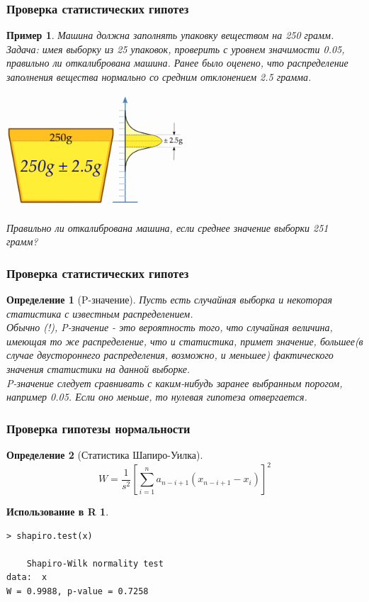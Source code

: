 \documentclass{beamer}
\newtheorem{defn}{Определение}
\newtheorem{exmpr}{Использование в R}
\newtheorem{exmp}{Пример}
\begin{document}
\begin{frame}
\frametitle{Проверка статистических гипотез}
\begin{exmp}
Машина должна заполнять упаковку веществом на 250 грамм. Задача: имея выборку из 25 упаковок, проверить  с уровнем значимости 0.05, правильно ли откалибрована машина. Ранее было оценено, что распределение заполнения вещества нормально со средним отклонением 2.5 грамма.
\begin{center}
\includegraphics[width=0.5\textwidth,height=0.35\textheight]{margarinefilling.png}
\end{center}  
Правильно ли откалибрована машина, если среднее значение выборки 251 грамм?
\end{exmp}

\end{frame}


\begin{frame}
\frametitle{Проверка статистических гипотез}
\begin{defn}[P-значение]
Пусть есть случайная выборка и некоторая статистика с известным распределением.\\
Обычно (!), P-значение - это вероятность того, что случайная величина, имеющая то же распределение, что и статистика, примет значение, большее(в случае двустороннего распределения, возможно, и меньшее) фактического значения статистики на данной выборке.\\
P-значение следует сравнивать с каким-нибудь заранее выбранным порогом, например 0.05. Если оно меньше, то нулевая гипотеза отвергается.
\end{defn}

\end{frame}

\begin{frame}[containsverbatim]
\frametitle{Проверка гипотезы нормальности}
\begin{defn}[Статистика Шапиро-Уилка]
$$W=\frac{1}{s^2}\left[\sum_{i=1}^n a_{n-i+1} (x_{n-i+1} -x_i)\right]^2$$
\end{defn}
\begin{exmpr}
\begin{verbatim}
> shapiro.test(x)
	
    Shapiro-Wilk normality test
data:  x 
W = 0.9988, p-value = 0.7258
\end{verbatim}
\end{exmpr}
\end{frame}
\end{document}
